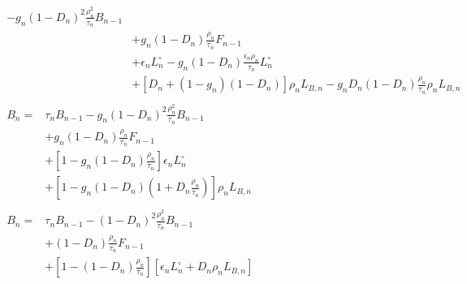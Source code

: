 \documentclass[11pt,a4paper]{article}
\begin{document}
\begin{align}
\begin{split}
		- g_n \left(1 - D_n\right)^2 \frac{\rho_n^2}{\tau_n} B_{n-1} \\&
		+ g_n \left(1 - D_n\right) \frac{\rho_n}{\tau_n} F_{n-1} \\&
		+ \epsilon_n L^\circ_n
		- g_n \left(1 - D_n\right) \frac{\epsilon_n \rho_n}{\tau_n} L^\circ_n \\&
		+ \left[D_n + \left(1 - g_n\right)\left(1 - D_n\right)\right] \rho_n L_{B,n}
		- g_n D_n \left(1 - D_n\right) \frac{\rho_n}{\tau_n} \rho_n L_{B,n}
\end{split}\\
\begin{split}
	B_n = & 
		\tau_n B_{n-1}
		- g_n \left(1 - D_n\right)^2 \frac{\rho_n^2}{\tau_n} B_{n-1} \\&
		+ g_n \left(1 - D_n\right) \frac{\rho_n}{\tau_n} F_{n-1} \\&
		+ \left[1 - g_n \left(1 - D_n\right) \frac{\rho_n}{\tau_n}\right] \epsilon_n L^\circ_n \\&
		+ \left[1 - g_n \left(1 - D_n\right) \left(1 + D_n \frac{\rho_n}{\tau_n}\right)\right] \rho_n L_{B,n}
\end{split}\\
\begin{split}
	B_n = & 
		\tau_n B_{n-1}
		- \left(1 - D_n\right)^2 \frac{\rho_n^2}{\tau_n} B_{n-1} \\&
		+ \left(1 - D_n\right) \frac{\rho_n}{\tau_n} F_{n-1} \\&
		+ \left[1 - \left(1 - D_n\right) \frac{\rho_n}{\tau_n}\right] \left[\epsilon_n L^\circ_n + D_n \rho_n L_{B,n} \right]
\end{split}
\end{align}
\end{document}
